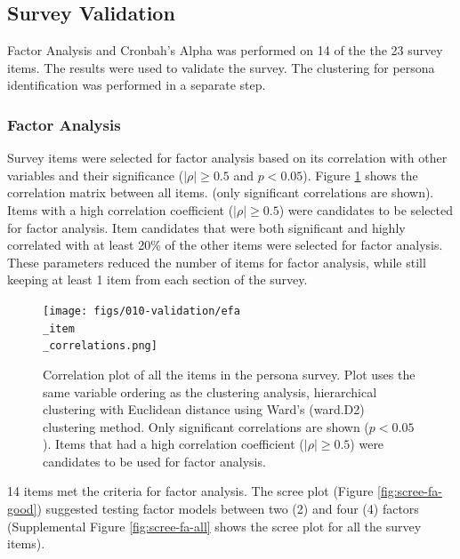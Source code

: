 \documentclass[020-persona\_validation.tex]{subfiles}
\begin{document}
    \subsection{Survey Validation}

        Factor Analysis and Cronbah's Alpha was performed on 14 of the the 23 survey items.
        The results were used to validate the survey.
        The clustering for persona identification was performed in a separate step.

    \subsubsection{Factor Analysis}

        Survey items were selected for factor analysis based on its correlation with other variables and their significance
        ($\left|\rho\right| \ge 0.5$ and $p < 0.05$).
        Figure \ref{fig:persona-item-corr} shows the correlation matrix between all items.
        (only significant correlations are shown).
        Items with a high correlation coefficient ($\left|\rho\right| \ge 0.5$) were candidates to be selected for factor analysis.
        Item candidates that were both significant and highly correlated with at least 20\% of the other items were
        selected for factor analysis.
        These parameters reduced the number of items for factor analysis,
        while still keeping at least 1 item from each section of the survey.

        \begin{figure}[!hbtp]
            \centering
            \texttt{[image: figs/010-validation/efa\\\_item\\\_correlations.png]}
            \caption[Correlation matrix of persona items]
            {Correlation plot of all the items in the persona survey.
             Plot uses the same variable ordering as the clustering analysis,
             hierarchical clustering with Euclidean distance using Ward's (ward.D2) clustering method.
             Only significant correlations are shown ($p < 0.05$).
             Items that had a high correlation coefficient ($\left|\rho\right| \ge 0.5$)
             were candidates to be used for factor analysis.
            }
            \label{fig:persona-item-corr}
        \end{figure}

        14 items met the criteria for factor analysis.
        The scree plot (Figure \ref{fig:scree-fa-good}) suggested testing factor models between two (2) and four (4) factors
        (Supplemental Figure \ref{fig:scree-fa-all} shows the scree plot for all the survey items).
\end{document}
